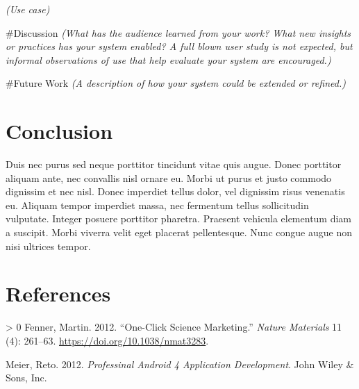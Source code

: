 \documentclass{acm_proc_article-sp}
\newlength{\cslhangindent}
\newenvironment{CSLReferences}[3] %
 {%
  \setlength{\parindent}{0pt}
  \ifodd #1 \everypar{\setlength{\hangindent}{\cslhangindent}}\ignorespaces\fi
  \ifnum #2 > 0
  \setlength{\parskip}{#2\baselineskip}
  \fi
 }%
 {}
\begin{document}
\emph{(Use case)}

\#Discussion \emph{(What has the audience learned from your work? What
new insights or practices has your system enabled? A full blown user
study is not expected, but informal observations of use that help
evaluate your system are encouraged.)}

\#Future Work \emph{(A description of how your system could be extended
or refined.)}

\hypertarget{conclusion}{%
\section{Conclusion}\label{conclusion}}

Duis nec purus sed neque porttitor tincidunt vitae quis augue. Donec
porttitor aliquam ante, nec convallis nisl ornare eu. Morbi ut purus et
justo commodo dignissim et nec nisl. Donec imperdiet tellus dolor, vel
dignissim risus venenatis eu. Aliquam tempor imperdiet massa, nec
fermentum tellus sollicitudin vulputate. Integer posuere porttitor
pharetra. Praesent vehicula elementum diam a suscipit. Morbi viverra
velit eget placerat pellentesque. Nunc congue augue non nisi ultrices
tempor.

\hypertarget{references}{%
\section*{References}\label{references}}

\hypertarget{refs}{}
\begin{CSLReferences}{1}{0}
\leavevmode\hypertarget{ref-fenner2012a}{}%
Fenner, Martin. 2012. {``One-Click Science Marketing.''} \emph{Nature
Materials} 11 (4): 261--63. \url{https://doi.org/10.1038/nmat3283}.

\leavevmode\hypertarget{ref-meier2012}{}%
Meier, Reto. 2012. \emph{Professinal Android 4 Application Development}.
John Wiley \& Sons, Inc.

\end{CSLReferences}
\setlength{\parindent}{0in}
\end{document}

